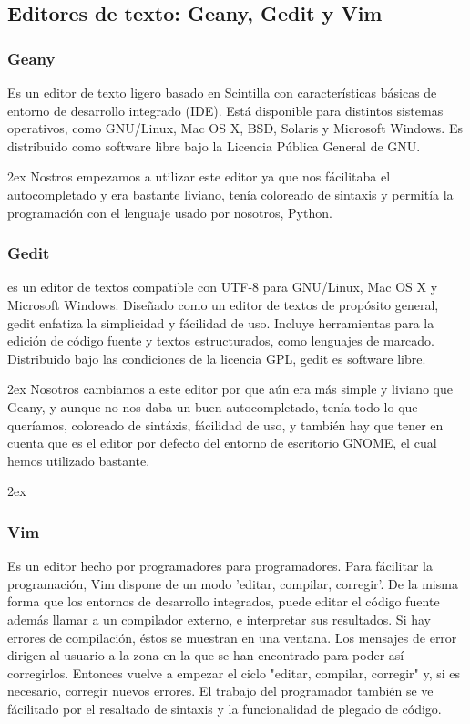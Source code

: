 \documentclass[12pt,a4paper]{report}
\begin{document}
\subsection{Editores de texto: Geany, Gedit y Vim}

\subsubsection{Geany} 

Es un editor de texto ligero basado en Scintilla con características básicas de
entorno de desarrollo integrado (IDE). Está disponible para distintos sistemas
operativos, como GNU/Linux, Mac OS X, BSD, Solaris y Microsoft Windows.  Es
distribuido como software libre bajo la Licencia Pública General de GNU.

\parskip 2ex
Nostros empezamos a utilizar este editor ya que nos fácilitaba el autocompletado
y era bastante liviano, tenía coloreado de sintaxis y permitía la programación
con el lenguaje usado por nosotros, Python. 

\subsubsection{Gedit}

es un editor de textos compatible con UTF-8 para GNU/Linux, Mac OS X y Microsoft
Windows. Diseñado como un editor de textos de propósito general, gedit enfatiza
la simplicidad y fácilidad de uso. Incluye herramientas para la edición de
código fuente y textos estructurados, como lenguajes de marcado. Distribuido
bajo las condiciones de la licencia GPL, gedit es software libre. 

\parskip 2ex
Nosotros cambiamos a este editor por que aún era más simple y liviano que Geany,
y aunque no nos daba un buen autocompletado, tenía todo lo que queríamos,
coloreado de sintáxis, fácilidad de uso, y también hay que tener en cuenta que
es el editor por defecto del entorno de escritorio GNOME, el cual hemos
utilizado bastante. 

\parskip 2ex

\subsubsection{Vim}

Es un editor hecho por programadores para programadores. Para fácilitar la
programación, Vim dispone de un modo 'editar, compilar, corregir'.  De la misma
forma que los entornos de desarrollo integrados, puede editar el código fuente
además llamar a un compilador externo, e interpretar sus resultados. Si hay
errores de compilación, éstos se muestran en una ventana. Los mensajes de error
dirigen al usuario a la zona en la que se han encontrado para poder así
corregirlos. Entonces vuelve a empezar el ciclo "editar, compilar, corregir" y,
si es necesario, corregir nuevos errores. El trabajo del programador también se
ve fácilitado por el resaltado de sintaxis y la funcionalidad de plegado de
código.
\end{document}
